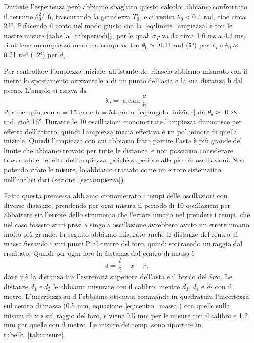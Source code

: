 \documentclass[a4paper]{article}
\begin{document}
Durante l'esperienza però abbiamo sbagliato questo calcolo: abbiamo confrontato il termine $\theta_0^2/16$, trascurando la grandezza $T_0$, \newline e ci veniva $\theta_0 < 0.4$ rad, cioè circa 23°. Rifacendo il conto nel modo giusto con la~\eqref{eq:limite_ampiezza} e con le nostre misure (tabella~\ref{tab:periodi}), per le quali $\sigma_T$ va da circa 1.6 ms a 4.4 ms, si ottiene un’ampiezza massima compresa tra $\theta_0 \approx $ 0.11 rad (6°) per $d_5$ e $\theta_0 \approx$ 0.21 rad (12°) per $d_1$.

Per controllare l’ampiezza iniziale, all’istante del rilascio abbiamo misurato con il metro lo spostamento orizzontale a di un punto dell’asta e la sua distanza h dal perno. L’angolo si ricava da
\begin{equation}
    \theta_0 = \arcsin\frac{a}{h}.
    \label{eq:angolo_iniziale}
\end{equation}
Per esempio, con a = 15 cm e h = 54 cm la~\eqref{eq:angolo_iniziale} dà $\theta_0 \approx$ 0.28 rad, cioè 16°. Durante le 10 oscillazioni cronometrate l’ampiezza diminuisce per effetto dell’attrito, quindi l’ampiezza media effettiva è un po’ minore di quella iniziale.
Quindi l'ampiezza con cui abbiamo fatto partire l'asta è più grande del limite che abbiamo trovato per tutte le distanze, e non possiamo considerare trascurabile l'effetto dell'ampiezza, poichè superiore alle piccole oscillazioni. Non potendo rifare le misure, lo abbiamo trattato come un errore sistematico nell'analisi dati (sezione~\ref{sec:ampiezza}).

Fatta questa premessa abbiamo cronometrato i tempi delle oscillazioni con diverse distanze, prendendo per ogni misura il periodo di 10 oscillazioni per abbattere sia l'errore dello strumento che l'errore umano nel prendere i tempi, che nel caso fossero stati presi a singola oscillazione avrebbero avuto un errore umano molto più grande. In seguito abbiamo misurato anche le distanze del centro di massa fissando i vari punti P al centro del foro, quindi sottraendo un raggio dal risultato.
Quindi per ogni foro la distanza dal centro di massa è
\begin{equation}
    d = \frac{l}{2} - x - r ,
    \label{eq:distanza}
\end{equation}
dove x è la distanza tra l'estremità superiore dell'asta e il bordo del foro. Le distanze $d_1$ e $d_2$ le abbiamo misurate con il calibro, mentre $d_3$, $d_4$ e $d_5$ con il metro. L'incertezza su d l'abbiamo ottenuta sommando in quadratura l'incertezza sul centro di massa (0.5 mm, equazione~\eqref{eq:centro_massa}) con quelle sulla misura di x e sul raggio del foro, e viene 0.5 mm per le misure con il calibro e 1.2 mm per quelle con il metro. Le misure dei tempi sono riportate in tabella~\ref{tab:misure}.
\end{document}
